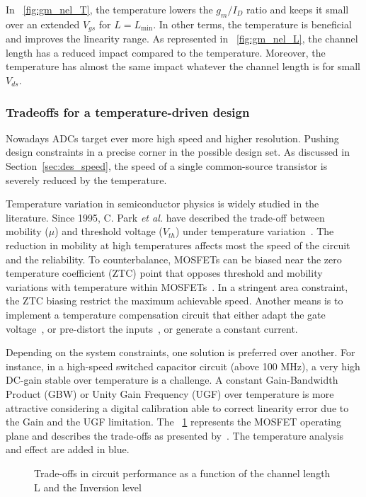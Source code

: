 In \figurename~\ref{fig:gm_nel_T}, the temperature lowers the \(g_m/I_D\) ratio and keeps it small over an extended \(V_{gs}\) for \(L = L_{\min}\). In other terms, the temperature is beneficial and improves the linearity range. As represented in \figurename~\ref{fig:gm_nel_L}, the channel length has a reduced impact compared to the temperature. Moreover, the temperature has almost the same impact whatever the channel length is for small \(V_{ds}\).

\subsubsection{Tradeoffs for a temperature-driven design}
Nowadays ADCs target ever more high speed and higher resolution. Pushing design constraints in a precise corner in the possible design set. As discussed in Section~\ref{sec:des_speed}, the speed of a single common-source transistor is severely reduced by the temperature.

Temperature variation in semiconductor physics is widely studied in the literature. Since 1995, C. Park \textit{et al.} have described the trade-off between mobility (\(\mu \)) and threshold voltage (\(V_{th} \)) under temperature variation~\cite{Park1995}. The reduction in mobility at high temperatures affects most the speed of the circuit and the reliability. To counterbalance, MOSFETs can be biased near the zero temperature coefficient (ZTC) point that opposes threshold and mobility variations with temperature within MOSFETs~\cite{Shoucair1986,Filanovsky2001}. In a stringent area constraint, the ZTC biasing restrict the maximum achievable speed. Another means is to implement a temperature compensation circuit that either adapt the gate voltage~\cite{Chen2011, Gomez2010}, or pre-distort the inputs~\cite{Sira2013}, or generate a constant current.

Depending on the system constraints, one solution is preferred over another. For instance, in a high-speed switched capacitor circuit (above 100 MHz), a very high DC-gain stable over temperature is a challenge. A constant Gain-Bandwidth Product (GBW) or Unity Gain Frequency (UGF) over temperature is more attractive considering a digital calibration able to correct linearity error due to the Gain and the UGF limitation. The \figurename~\ref{fig:tradeoffs} represents the MOSFET operating plane and describes the trade-offs as presented by~\cite{Binkley2003}. The temperature analysis and effect are added in blue.
\begin{figure}[!ht]
	\centering
	
	\caption{Trade-offs in circuit performance as a function of the channel length L and the Inversion level}
	\label{fig:tradeoffs}
\end{figure}

